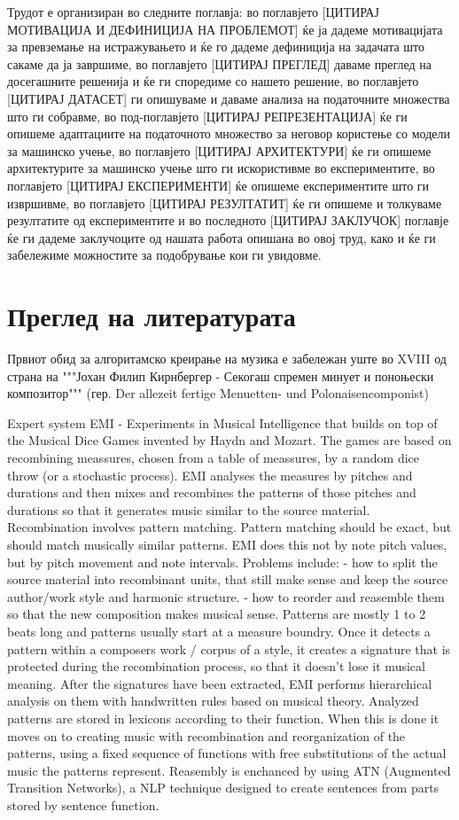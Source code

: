 Трудот е организиран во следните поглавја: во поглавјето [ЦИТИРАЈ МОТИВАЦИЈА И ДЕФИНИЦИЈА НА ПРОБЛЕМОТ] ќе ја дадеме мотивацијата за превземање на истражувањето и ќе го дадеме дефиниција на задачата што сакаме да ја завршиме, во поглавјето [ЦИТИРАЈ ПРЕГЛЕД] даваме преглед на досегашните решенија и ќе ги споредиме со нашето решение, во поглавјето [ЦИТИРАЈ ДАТАСЕТ] ги опишуваме и даваме анализа на податочните множества што ги собравме, во под-поглавјето [ЦИТИРАЈ РЕПРЕЗЕНТАЦИЈА] ќе ги опишеме адаптациите на податочното множество за неговор користење со модели за машинско учење, во поглавјето [ЦИТИРАЈ АРХИТЕКТУРИ] ќе ги опишеме архитектурите за машинско учење што ги искористивме во експериментите, во поглавјето [ЦИТИРАЈ ЕКСПЕРИМЕНТИ] ќе опишеме експериментите што ги извршивме, во поглавјето [ЦИТИРАЈ РЕЗУЛТАТИТ] ќе ги опишеме и толкуваме резултатите од експериментите и во последното [ЦИТИРАЈ ЗАКЛУЧОК] поглавје ќе ги дадеме заклучоците од нашата работа опишана во овој труд, како и ќе ги забележиме можностите за подобрување кои ги увидовме.

\chapter{Преглед на литературата}

Првиот обид за алгоритамско креирање на музика е забележан уште во XVIII од страна на """Јохан Филип Кирнбергер - Секогаш спремен минует и поноњески композитор""" (гер. Der allezeit fertige Menuetten- und Polonaisencomponist)

\cite{Cope1991} Expert system EMI - Experiments in Musical Intelligence that builds on top of the Musical Dice Games invented by Haydn and Mozart. The games are based on recombining meassures, chosen from a table of meassures, by a random dice throw (or a stochastic process). EMI analyses the measures by pitches and durations and then mixes and recombines the patterns of those pitches and durations so that it generates music similar to the source material. Recombination involves pattern matching. Pattern matching should be exact, but should match musically similar patterns. EMI does this not by note pitch values, but by pitch movement and note intervals. Problems include: - how to split the source material into recombinant units, that still make sense and keep the source author/work style and harmonic structure. - how to reorder and reasemble them so that the new composition makes musical sense. Patterns are mostly 1 to 2 beats long and patterns usually start at a measure boundry. Once it detects a pattern within a composers work / corpus of a style, it creates a signature that is protected during the recombination process, so that it doesn't lose it musical meaning. After the signatures have been extracted, EMI performs hierarchical analysis on them with handwritten rules based on musical theory. Analyzed patterns are stored in lexicons according to their function. When this is done it moves on to creating music with recombination and reorganization of the patterns, using a fixed sequence of functions with free substitutions of the actual music the patterns represent. Reasembly is enchanced by using ATN (Augmented Transition Networks), a NLP technique designed to create sentences from parts stored by sentence function.

